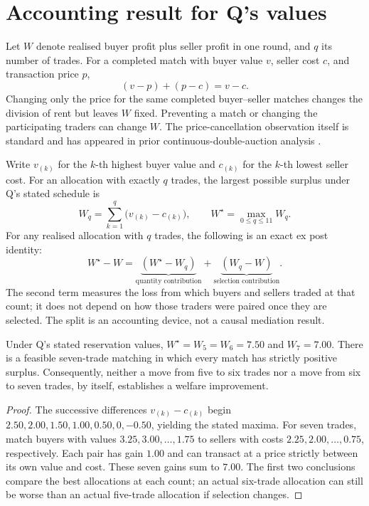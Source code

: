 \documentclass{article}
\begin{document}
\section{Accounting result for Q's values}

Let \(W\) denote realised buyer profit plus seller profit in one round, and \(q\) its number of trades.
For a completed match with buyer value \(v\), seller cost \(c\), and transaction price \(p\),
\[
(v-p)+(p-c)=v-c.
\]
Changing only the price for the same completed buyer--seller matches changes the division of rent but
leaves \(W\) fixed. Preventing a match or changing the participating traders can change \(W\). The
price-cancellation observation itself is standard and has appeared in prior continuous-double-auction
analysis \cite{wah2017}.

Write \(v_{(k)}\) for the \(k\)-th highest buyer value and \(c_{(k)}\) for the \(k\)-th lowest seller
cost. For an allocation with exactly \(q\) trades, the largest possible surplus under Q's stated schedule
is
\[
W_q=\sum_{k=1}^{q}\bigl(v_{(k)}-c_{(k)}\bigr),
\qquad W^\star=\max_{0\leq q\leq11} W_q.
\]
For any realised allocation with \(q\) trades, the following is an exact ex post identity:
\[
W^\star-W=\underbrace{(W^\star-W_q)}_{\text{quantity contribution}}
            +\underbrace{(W_q-W)}_{\text{selection contribution}}.
\]
The second term measures the loss from which buyers and sellers traded at that count; it does not depend
on how those traders were paired once they are selected. The split is an accounting device, not a causal
mediation result.

\begin{proposition}
Under Q's stated reservation values, \(W^\star=W_5=W_6=7.50\) and \(W_7=7.00\). There is a feasible
seven-trade matching in which every match has strictly positive surplus. Consequently, neither a move from
five to six trades nor a move from six to seven trades, by itself, establishes a welfare improvement.
\end{proposition}

\begin{proof}
The successive differences \(v_{(k)}-c_{(k)}\) begin \(2.50,2.00,1.50,1.00,0.50,0,-0.50\), yielding the
stated maxima. For seven trades, match buyers with values \(3.25,3.00,\ldots,1.75\) to sellers with costs
\(2.25,2.00,\ldots,0.75\), respectively. Each pair has gain \(1.00\) and can transact at a price strictly
between its own value and cost. These seven gains sum to \(7.00\). The first two conclusions compare the
best allocations at each count; an actual six-trade allocation can still be worse than an actual
five-trade allocation if selection changes.
\end{proof}
\end{document}
